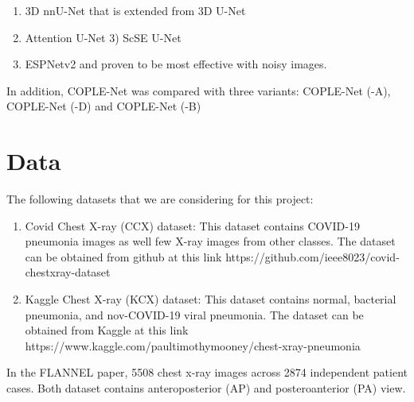 \documentclass{sigkddExp}
\begin{document}
\begin{enumerate}
    \item 3D nnU-Net that is extended from 3D U-Net
    \item Attention U-Net 3) ScSE U-Net
    \item ESPNetv2 and proven to be most effective with noisy images.
\end{enumerate}

In addition, COPLE-Net was compared with three variants: COPLE-Net (-A), COPLE-Net (-D)
and COPLE-Net (-B) 

%

\section{Data}

The following datasets that we are considering for this project:
\begin{enumerate}
    
    \item Covid Chest X-ray (CCX) dataset: This dataset contains COVID-19 pneumonia images 
    as well few X-ray images from other classes. The dataset can be obtained from 
    github at this link   
    https://github.com/ieee8023/covid-chestxray-dataset
    
    \item Kaggle Chest X-ray (KCX) dataset: This dataset contains normal, bacterial pneumonia, 
    and nov-COVID-19 viral pneumonia. The dataset can be obtained from Kaggle at this 
    link
    https://www.kaggle.com/paultimothymooney/chest-xray-pneumonia
\end{enumerate}


In the FLANNEL paper, 5508 chest x-ray images across 2874 independent patient cases. Both dataset contains anteroposterior (AP) and posteroanterior (PA) view.
\end{document}
